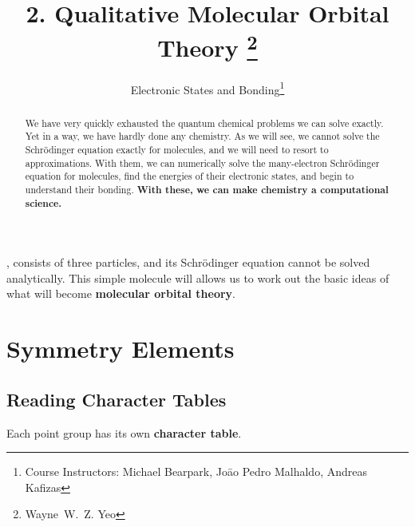 \documentclass[a4paper]{tufte-handout}
\title{2. Qualitative Molecular Orbital Theory \thanks{Wayne~W.~Z. Yeo}}
\author[ESB]{Electronic States and Bonding\thanks{Course Instructors: Michael Bearpark, Joāo Pedro Malhaldo, Andreas Kafizas}}
\theoremstyle{definition}
\begin{document}
\maketitle%

\begin{abstract}
\noindent
We have very quickly exhausted the quantum chemical problems we can solve exactly.
Yet in a way, we have hardly done any chemistry. As we will see, we cannot solve the 
Schrödinger equation exactly for molecules, and we will need to resort to approximations.
With them, we can numerically solve the many-electron Schrödinger
equation for molecules, find the energies of their electronic states, and begin to
understand their bonding. \textbf{With these, we can make chemistry a computational science.}
\end{abstract}


,  consists of three particles, and its
Schrödinger equation cannot be solved analytically. This simple molecule
will allows us to work out the basic ideas of what will become \textbf{molecular orbital theory}.

\section{Symmetry Elements}

\subsection{Reading Character Tables}
Each point group has its own \textbf{character table}.
\end{document}
